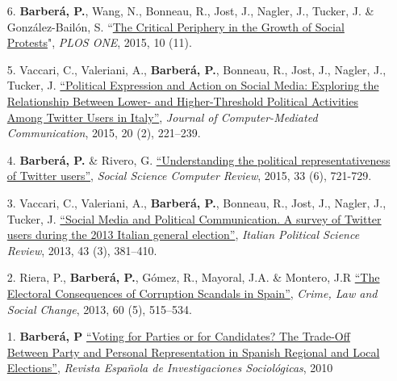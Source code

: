 \documentclass[margin,line,11pt]{resume}
\begin{document}
\begin{resume}
\begin{itemize}[leftmargin=5.5mm]
\item[6.] \textbf{Barber\'{a}, P.}, Wang, N., Bonneau, R., Jost, J., Nagler, J., Tucker, J. \& Gonz\'{a}lez-Bail\'{o}n, S. ``\href{http://journals.plos.org/plosone/article?id=10.1371/journal.pone.0143611}{The Critical Periphery in the Growth of Social Protests}", \textit{PLOS ONE}, 2015, 10 (11).

\item[5.] Vaccari, C., Valeriani, A., \textbf{Barber\'{a}, P.}, Bonneau, R., Jost, J., Nagler, J., Tucker, J. \href{http://onlinelibrary.wiley.com/doi/10.1111/jcc4.12108/abstract#.VLRLl9mdVFM.twitter}{``Political Expression and Action on Social Media: Exploring the Relationship Between Lower- and Higher-Threshold Political Activities Among Twitter Users in Italy''}, \emph{Journal of Computer-Mediated Communication}, 2015, 20 (2), 221--239.


\item[4.] \textbf{Barber\'{a}, P.} \& Rivero, G. \href{http://ssc.sagepub.com/content/33/6/712}{``Understanding the political representativeness of Twitter users''}, \textit{Social Science Computer Review}, 2015, 33 (6), 721-729.

\item[3.] Vaccari, C., Valeriani, A., \textbf{Barber\'{a}, P.}, Bonneau, R., Jost, J., Nagler, J., Tucker, J. \href{http://www.rivisteweb.it/doi/10.1426/75245}{``Social Media and Political Communication. A survey of Twitter users during the 2013 Italian general election''}, \emph{Italian Political Science Review}, 2013, 43 (3), 381--410.

\item[2.] Riera, P., \textbf{Barber\'{a}, P.}, G\'{o}mez, R., Mayoral, J.A. \& Montero, J.R \href{http://link.springer.com/article/10.1007/s10611-013-9479-1}{``The Electoral Consequences of Corruption Scandals in Spain''}, \emph{Crime, Law and Social Change}, 2013, 60 (5), 515--534.

\item[1.] \textbf{Barber\'{a}, P} \href{http://www.reis.cis.es/REIS/PDF/REIS_132_021285919804928.pdf}{``Voting for Parties or for Candidates? The Trade-Off Between Party and Personal Representation in Spanish Regional and Local Elections''}, \emph{Revista Espa\~{n}ola de Investigaciones Sociol\'{o}gicas}, 2010

\end{itemize}    



\end{resume}
\end{document}
